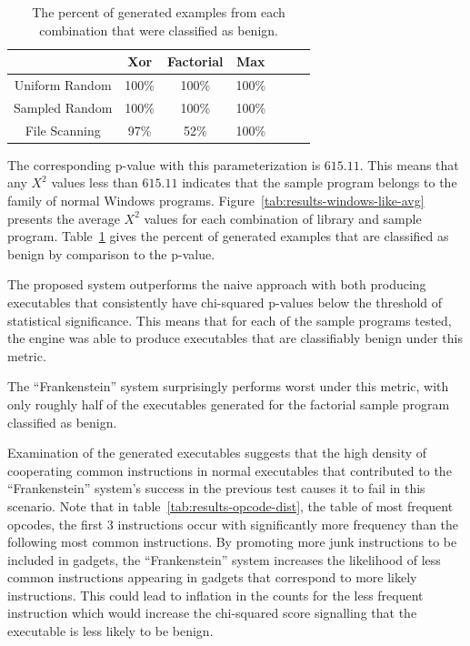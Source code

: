     \begin{table}
        \centering
        \begin{tabular}{|c||c|c|c|c|c|c|}
            \hline
                            & Xor & Factorial & Max \\
            \hline
            Uniform Random  & 100\% & 100\% & 100\%\\
            \hline
            Sampled Random  & 100\% & 100\% & 100\%\\
            \hline
            File Scanning   & 97\% & 52\% & 100\% \\
            \hline
        \end{tabular}
        \caption{The percent of generated examples from each combination
            that were classified as benign.}
        \label{tab:results-windows-like-passed}
    \end{table}

    The corresponding p-value with this parameterization is $615.11$. This
    means that any $X^2$ values less than $615.11$ indicates that the sample
    program belongs to the family of normal Windows programs.
    Figure~\ref{tab:results-windows-like-avg} presents the average $X^2$
    values for each combination of library and sample program.
    Table~\ref{tab:results-windows-like-passed} gives the percent of
    generated examples that are classified as benign by comparison to the
    p-value.

    The proposed system outperforms the naive approach with both producing
    executables that consistently have chi-squared p-values below the threshold
    of statistical significance. This means that for each of the sample
    programs tested, the engine was able to produce executables that are
    classifiably benign under this metric.

    The ``Frankenstein'' system surprisingly performs worst under this metric,
    with only roughly half of the executables generated for the factorial sample
    program classified as benign.

    Examination of the generated executables suggests that the high density of
    cooperating common instructions in normal executables that contributed to
    the ``Frankenstein'' system's success in the previous test causes it to fail
    in this scenario. Note that in table~\ref{tab:results-opcode-dist}, the
    table of most frequent opcodes, the first 3 instructions occur with
    significantly more frequency than the following most common instructions. By
    promoting more junk instructions to be included in gadgets, the
    ``Frankenstein'' system increases the likelihood of less common instructions
    appearing in gadgets that correspond to more likely instructions. This could
    lead to inflation in the counts for the less frequent instruction which
    would increase the chi-squared score signalling that the executable is less
    likely to be benign.


